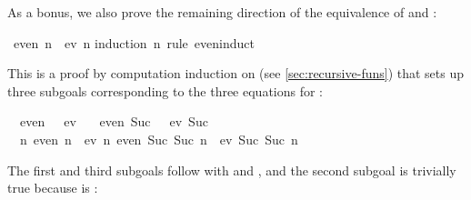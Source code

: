 \begin{isabellebody}
\begin{isamarkuptext}
As a bonus, we also prove the remaining direction of the equivalence of
 and :%
\end{isamarkuptext}%
\isamarkuptrue%
\isamarkupfalse%
\ {}even\ n\ {}\ ev\ n{}\isanewline
%
\isadelimproof
%
\endisadelimproof
%
\isatagproof
{}\isamarkupfalse%
{}induction\ n\ rule{}\ even{}induct{}%
\begin{isamarkuptxt}%
This is a proof by computation induction on  (see
\autoref{sec:recursive-funs}) that sets up three subgoals corresponding to
the three equations for :
\begin{isabelle}%
\ {}{}\ even\ {}\ {}\ ev\ {}\isanewline
\ {}{}\ even\ {}Suc\ {}{}\ {}\ ev\ {}Suc\ {}{}\isanewline
\ {}{}\ {}n{}\ {}even\ n\ {}\ ev\ n{}\ even\ {}Suc\ {}Suc\ n{}{}{}\ {}\ ev\ {}Suc\ {}Suc\ n{}{}%
\end{isabelle}
The first and third subgoals follow with  and , and the second subgoal is trivially true because  is :%
\end{isamarkuptxt}%
\isamarkuptrue%
\isamarkupfalse%

\end{isabellebody}

